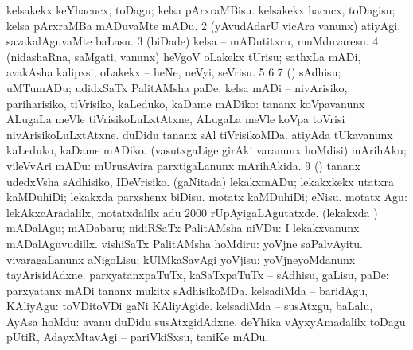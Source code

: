 {{{{{{\begin{center}
\noindent
\gl{\pagu}
\expl{}
\bmng
\bnum
{}  
\banum
{} kelsakekx keYhacucx, toDagu; kelsa pArxraMBisu. 
 kelsakekx hacucx, toDagisu; kelsa pArxraMBa mADuvaMte mADu. 
\eanum
\numie
\num{2} (yAvudAdarU vicAra \mo vanunx) atiyAgi, savakalAguvaMte baLasu. 
\num{3}  (biDade) kelsa -- mADutitxru, muMduvaresu. 
\num{4}  (nidashaRna, saMgati, \mo vanunx) heVgoV oLakekx tUrisu; sathxLa mADi, avakAsha kalipxsi, oLakekx -- heNe, neVyi, seVrisu. 
\num{5}  
\num{6}  
\num{7}  (\AmA) sAdhisu; uMTumADu; udidxSaTx PalitAMsha paDe. 
\banum
{} kelsa mADi -- nivArisiko, pariharisiko, tiVrisiko, kaLeduko, kaDame mADiko:  tananx koVpavanunx ALugaLa meVle tiVrisikoLuLxtAtxne, ALugaLa meVle koVpa toVrisi nivArisikoLuLxtAtxne.  duDidu tananx sAl tiVrisikoMDa.  atiyAda tUkavanunx kaLeduko, kaDame mADiko. 
 (vasutxgaLige girAki \mo varanunx hoMdisi) mArihAku; vileVvAri mADu:    mUrusAvira parxtigaLanunx mArihAkida. 
\eanum
\numie
\num{9}  (\AmA) tananx udedxVsha sAdhisiko, IDeVrisiko. 
  
\banum
{} (gaNitada) lekakxmADu; lekakxkekx utatxra kaMDuhiDi; lekakxda parxshenx biDisu. 
 motatx kaMDuhiDi; eNisu. 
 motatx Agu:  lekAkxcAradalilx, motatxdalilx adu $2000$ rUpAyigaLAgutatxde. 
 (lekakxda \vi) mADalAgu; mADabaru; nidiRSaTx PalitAMsha niVDu:  I lekakxvanunx mADalAguvudillx. 
 vishiSaTx PalitAMsha hoMdiru:  yoVjne saPalvAyitu. 
 vivaragaLanunx aNigoLisu; kUlMkaSavAgi yoVjisu:  yoVjneyoMdanunx tayArisidAdxne. 
 parxyatanxpaTuTx, kaSaTxpaTuTx -- sAdhisu, gaLisu, paDe:  parxyatanx mADi tananx mukitx sAdhisikoMDa. 
 kelsadiMda -- baridAgu, KAliyAgu:  toVDitoVDi gaNi KAliyAgide. 
 kelsadiMda -- susAtxgu, baLalu, AyAsa hoMdu:  avanu duDidu susAtxgidAdxne. 
 deYhika vAyxyAmadalilx toDagu 
\eanum
\numie
{}  
\banum
{} pUtiR, AdayxMtavAgi -- pariVkiSxsu, taniKe mADu. 

\end{center}}}}}}}
